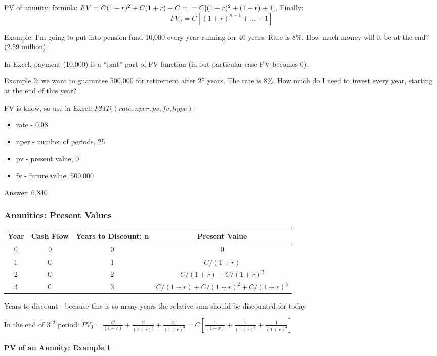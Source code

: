 \documentclass{scrartcl}
\begin{document}
FV of annuity: formula: $FV = C(1 + r)^2 + C(1+r) + C = \\
= C[(1+r)^2 + (1+r) + 1]$. Finally: $$FV_n = C[(1+r)^{n-1} + \dots + 1]$$

Example: I'm going to put into pension fund 10,000 every year running for 40
years. Rate is 8\%. How much money will it be at the end? (2.59 million)

In Excel, payment (10,000) is a ``pmt'' part of FV function (in out particular
case PV becomes 0).

Example 2: we want to guarantee 500,000 for retirement after 25 years. The rate
is 8\%. How much do I need to invest every year, starting at the end of this
year?

FV is know, so use in Excel: $PMT((rate, nper, pv, fv, hype)$:
\begin{itemize}
\item rate - 0.08
\item nper - number of periods, 25
\item pv - present value, 0
\item fv - future value, 500,000
\end{itemize}
Answer: 6,840

\subsubsection{Annuities: Present Values}

\begin{tabular}{c|c|c|c}
  Year & Cash Flow & Years to Discount: n & Present Value \\
  \hline
  0 & 0 & 0 & 0 \\
  1 & C & 1 & $C/(1 + r)$ \\
  2 & C & 2 & $C/(1 + r) + C/(1 + r)^2$ \\
  3 & C & 3 & $C/(1 + r) + C/(1 + r)^2 + C/(1 + r)^3$
\end{tabular}

Years to discount - because this is so many years the relative sum should be
discounted for today

In the end of $3^{rd}$ period: $PV_3 = \frac{C}{(1+r)} + \frac{C}{(1+r)^2}
+\frac{C}{(1+r)^3} = C \left[\frac{1}{(1+r)} + \frac{1}{(1+r)^2} +
  \frac{1}{(1+r)^3} \right]$

\paragraph{PV of an Annuity: Example 1}
\label{sec:3-6}
\end{document}
